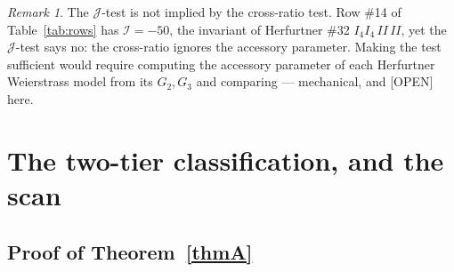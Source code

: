\documentclass[11pt,reqno]{amsart}
\theoremstyle{plain}
\theoremstyle{definition}
\theoremstyle{remark}
\newtheorem{remark}[theorem]{Remark}
\theoremstyle{plain}
\newcommand{\Open}{\textup{\textsf{[OPEN]}}}
\begin{document}
\begin{remark}
The $\mathcal J$-test is not implied by the cross-ratio test. Row \#14 of
Table~\ref{tab:rows} has $\mathcal I=-50$, the invariant of Herfurtner \#32
$I_4I_4\,II\,II$, yet the $\mathcal J$-test says no: the cross-ratio ignores the
accessory parameter. Making the test sufficient would require computing the
accessory parameter of each Herfurtner Weierstrass model from its $G_2,G_3$ and
comparing --- mechanical, and \Open{} here.
\end{remark}

\section{The two-tier classification, and the scan}\label{sec:scan}

\subsection{Proof of Theorem~\ref{thmA}}\label{sec:thmA}
\end{document}
